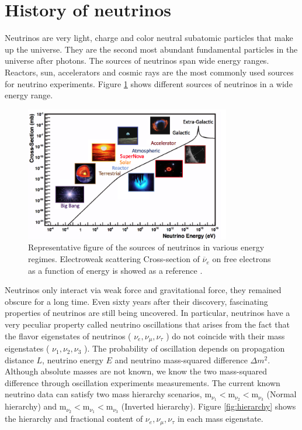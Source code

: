 \documentclass[11pt]{article}
\newcommand{\nuebar}{\ensuremath{\overline{\nu }_{e}} \hspace{1pt}}
\numberwithin{equation}{section}
\begin{document}
\newpage

\section[Neutrino background]{History of neutrinos}
\label{background}
Neutrinos are very light, charge and color neutral subatomic particles that make up the universe. They are the second most abundant fundamental particles in the universe after photons. The sources of neutrinos span wide energy ranges. Reactors, sun, accelerators and cosmic rays are the most commonly used sources for neutrino experiments. Figure \ref{fig:source} shows different sources of neutrinos in a wide energy range.

\begin{figure}[h]
\centering
  \includegraphics[width=0.8\textwidth]{./sources.PNG}
\caption[Neutrino sources]{Representative figure  of the sources of neutrinos in various energy regimes. Electroweak scattering Cross-section of \nuebar on free electrons as a function of energy is showed as a reference \cite{Formaggio}.}
\label{fig:source}
\end{figure}

Neutrinos only interact via weak force and gravitational force, they remained obscure for a long time. Even sixty years after their discovery, fascinating properties of neutrinos are still being uncovered. In particular, neutrinos have a very peculiar property called neutrino oscillations that arises from the fact that the flavor eigenstates of neutrinos ( $ \nu_{e}, \nu_{\mu}, \nu_{\tau} $ ) do not coincide with their mass eigenstates ( $ \nu_{1}, \nu_{2}, \nu_{3} $ ). The probability of oscillation depends on propagation distance $L$, neutrino energy $E$ and neutrino mass-squared difference $\Delta m^{2}$. Although absolute masses are not known, we know the two mass-squared difference through oscillation experiments measurements. The current known neutrino data can satisfy two mass hierarchy scenarios, $ \text{m}_{\nu_{1}}<\text{m}_{\nu_{2}}<\text{m}_{\nu_{3}} $ (Normal hierarchy) and $ \text{m}_{\nu_{2}}<\text{m}_{\nu_{1}}<\text{m}_{\nu_{3} }$ (Inverted hierarchy). Figure \ref{fig:hierarchy} shows the hierarchy and fractional content of $ \nu_{e}, \nu_{\mu}, \nu_{\tau} $ in each mass eigenstate.
\end{document}
